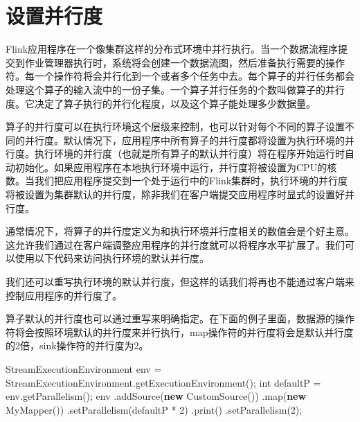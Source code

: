 \documentclass[cn,11pt,chinese]{elegantbook}
\newenvironment{Shaded}{}{}
\newcommand{\DataTypeTok}[1]{\textcolor[rgb]{0.56,0.13,0.00}{#1}}
\newcommand{\DecValTok}[1]{\textcolor[rgb]{0.25,0.63,0.44}{#1}}
\newcommand{\FunctionTok}[1]{\textcolor[rgb]{0.02,0.16,0.49}{#1}}
\newcommand{\KeywordTok}[1]{\textcolor[rgb]{0.00,0.44,0.13}{\textbf{#1}}}
\newcommand{\NormalTok}[1]{#1}
\begin{document}
\hypertarget{ux8bbeux7f6eux5e76ux884cux5ea6}{%
\section{设置并行度}\label{ux8bbeux7f6eux5e76ux884cux5ea6}}

Flink应用程序在一个像集群这样的分布式环境中并行执行。当一个数据流程序提交到作业管理器执行时，系统将会创建一个数据流图，然后准备执行需要的操作符。每一个操作符将会并行化到一个或者多个任务中去。每个算子的并行任务都会处理这个算子的输入流中的一份子集。一个算子并行任务的个数叫做算子的并行度。它决定了算子执行的并行化程度，以及这个算子能处理多少数据量。

算子的并行度可以在执行环境这个层级来控制，也可以针对每个不同的算子设置不同的并行度。默认情况下，应用程序中所有算子的并行度都将设置为执行环境的并行度。执行环境的并行度（也就是所有算子的默认并行度）将在程序开始运行时自动初始化。如果应用程序在本地执行环境中运行，并行度将被设置为CPU的核数。当我们把应用程序提交到一个处于运行中的Flink集群时，执行环境的并行度将被设置为集群默认的并行度，除非我们在客户端提交应用程序时显式的设置好并行度。

通常情况下，将算子的并行度定义为和执行环境并行度相关的数值会是个好主意。这允许我们通过在客户端调整应用程序的并行度就可以将程序水平扩展了。我们可以使用以下代码来访问执行环境的默认并行度。

我们还可以重写执行环境的默认并行度，但这样的话我们将再也不能通过客户端来控制应用程序的并行度了。

算子默认的并行度也可以通过重写来明确指定。在下面的例子里面，数据源的操作符将会按照环境默认的并行度来并行执行，map操作符的并行度将会是默认并行度的2倍，sink操作符的并行度为2。

\begin{Shaded}
\begin{Highlighting}[]
\NormalTok{StreamExecutionEnvironment env = StreamExecutionEnvironment.}\FunctionTok{getExecutionEnvironment}\NormalTok{();}
\DataTypeTok{int}\NormalTok{ defaultP = env.}\FunctionTok{getParallelism}\NormalTok{();}
\NormalTok{env}
\NormalTok{  .}\FunctionTok{addSource}\NormalTok{(}\KeywordTok{new} \FunctionTok{CustomSource}\NormalTok{())}
\NormalTok{  .}\FunctionTok{map}\NormalTok{(}\KeywordTok{new} \FunctionTok{MyMapper}\NormalTok{())}
\NormalTok{  .}\FunctionTok{setParallelism}\NormalTok{(defaultP * }\DecValTok{2}\NormalTok{)}
\NormalTok{  .}\FunctionTok{print}\NormalTok{()}
\NormalTok{  .}\FunctionTok{setParallelism}\NormalTok{(}\DecValTok{2}\NormalTok{);}
\end{Highlighting}
\end{Shaded}
\end{document}
